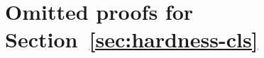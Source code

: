 \documentclass{article}
\theoremstyle{definition}  %
\theoremstyle{plain}
\numberwithin{observation}{section}
\numberwithin{claim}{section}
\numberwithin{fact}{section}
\numberwithin{lemma}{section}
\numberwithin{proposition}{section}
\numberwithin{theorem}{section}
\numberwithin{corollary}{section}
\numberwithin{definition}{section}
\newcommand{\Contrastive}{\textsc{LocalTripletLoss-Euclidean}}
\theoremstyle{plain}
\begin{document}
\section{Omitted proofs for Section~\ref{sec:hardness-cls}}\label{sec:omitted_proof_contrastive}

\end{document}
